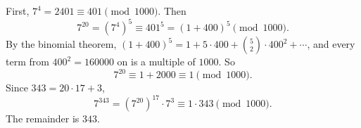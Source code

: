 First, $7^4=2401\equiv401\pmod{1000}$. Then
\[7^{20}=\left(7^4\right)^5\equiv401^5=(1+400)^5\pmod{1000}.\]
By the binomial theorem, $(1+400)^5=1+5\cdot400+\binom52\cdot400^2+\cdots$, and every term from $400^2=160000$ on is a multiple of $1000$. So
\[7^{20}\equiv1+2000\equiv1\pmod{1000}.\]
Since $343=20\cdot17+3$,
\[7^{343}=\left(7^{20}\right)^{17}\cdot7^3\equiv1\cdot343\pmod{1000}.\]
The remainder is $\boxed{343}$.

